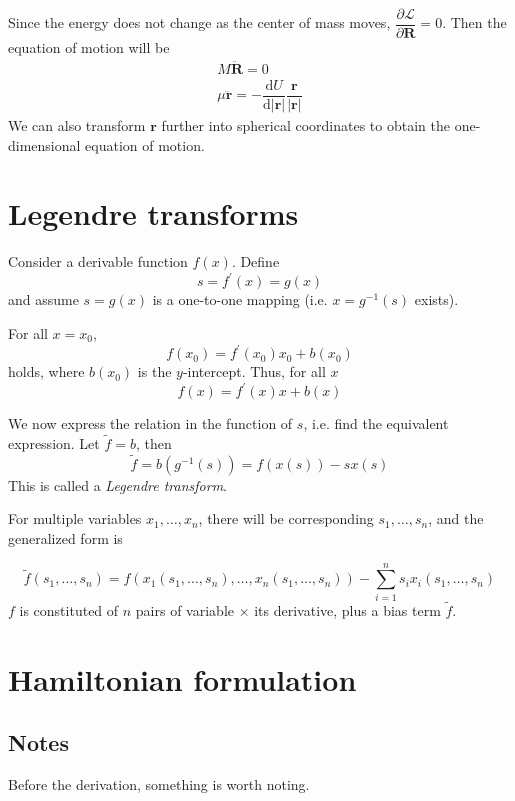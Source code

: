 \documentclass[
  10pt,
  twoside,
  openany,
  b5paper, %
  colorscheme = bootstrap-v4, %
]{qyxf-book}
\newcommand{\der}[2]{\dfrac{\md #1}{\md #2}}
\newcommand{\p}[2]{\dfrac{\partial #1}{\partial #2}}
\newcommand{\md}{\mathrm{d}}
\newcommand{\vr}{\boldsymbol{r}}
\newcommand{\ddvr}{\ddot{\vr}}
\newcommand{\lag}{\mathcal{L}} %
\begin{document}
Since the energy does not change as the center of mass moves, $\p{\lag}{\boldsymbol{R}}=0$. Then the equation of motion will be
\begin{gather*}
	M\ddot{\boldsymbol{R}}=0\\
	\mu\ddvr=-\der{U}{|\vr|}\dfrac{\vr}{|\vr|}
\end{gather*}
We can also transform $\vr$ further into spherical coordinates to obtain the one-dimensional equation of motion.

\section{Legendre transforms}

Consider a derivable function $f(x)$. Define
\begin{equation}
	s=f^\prime(x)=g(x)
\end{equation}
and assume $s=g(x)$ is a one-to-one mapping (i.e. $x=g^{-1}(s)$ exists).

For all $x=x_0$, 
\begin{equation*}
	f(x_0)=f^\prime(x_0)x_0+b(x_0)
\end{equation*}
holds, where $b(x_0)$ is the $y$-intercept. Thus, for all $x$
\begin{equation}
	f(x)=f^\prime(x)x+b(x)
\end{equation}

We now express the relation in the function of $s$, i.e. find the equivalent expression. Let $\tilde{f}=b$, then
\begin{equation}
	\tilde{f}=b(g^{-1}(s))=f(x(s))-sx(s)
\end{equation}
This is called a \textit{Legendre transform}.

For multiple variables $x_1, \dots, x_n$, there will be corresponding $s_1, \dots, s_n$, and the generalized form is
\begin{tcolorbox}
	\begin{equation}
		\tilde{f}(s_1, \dots, s_n)=f(x_1(s_1, \dots, s_n),\dots,x_n(s_1, \dots, s_n))-\sum_{i=1}^{n}s_ix_i(s_1, \dots, s_n)
	\end{equation}
	$f$ is constituted of $n$ pairs of variable $\times$ its derivative, plus a bias term $\tilde{f}$.
\end{tcolorbox}

\section{Hamiltonian formulation}
\subsection{Notes}
Before the derivation, something is worth noting.
\end{document}
